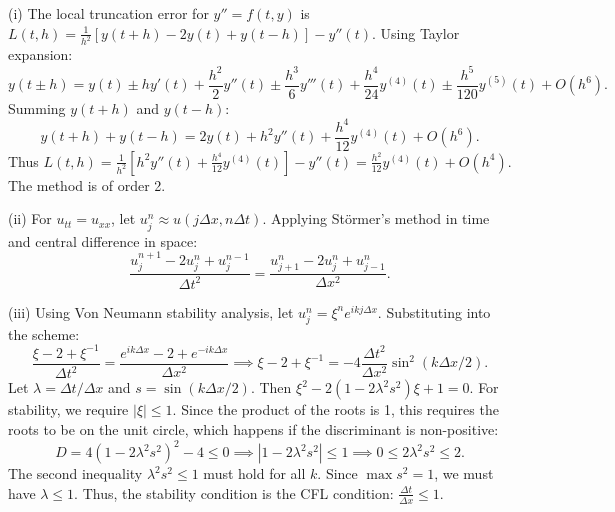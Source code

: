 \begin{solution}
(i) The local truncation error for $y'' = f(t,y)$ is $L(t, h) = \frac{1}{h^2} [y(t+h) - 2y(t) + y(t-h)] - y''(t)$. Using Taylor expansion:
\[
y(t \pm h) = y(t) \pm hy'(t) + \frac{h^2}{2} y''(t) \pm \frac{h^3}{6} y'''(t) + \frac{h^4}{24} y^{(4)}(t) \pm \frac{h^5}{120} y^{(5)}(t) + O(h^6).
\]
Summing $y(t+h)$ and $y(t-h)$:
\[
y(t+h) + y(t-h) = 2y(t) + h^2 y''(t) + \frac{h^4}{12} y^{(4)}(t) + O(h^6).
\]
Thus $L(t, h) = \frac{1}{h^2} [h^2 y''(t) + \frac{h^4}{12} y^{(4)}(t)] - y''(t) = \frac{h^2}{12} y^{(4)}(t) + O(h^4)$.
The method is of order 2.

(ii) For $u_{tt} = u_{xx}$, let $u_j^n \approx u(j \Delta x, n \Delta t)$. Applying St\"ormer's method in time and central difference in space:
\[
\frac{u_j^{n+1} - 2u_j^n + u_j^{n-1}}{\Delta t^2} = \frac{u_{j+1}^n - 2u_j^n + u_{j-1}^n}{\Delta x^2}.
\]

(iii) Using Von Neumann stability analysis, let $u_j^n = \xi^n e^{ik j \Delta x}$. Substituting into the scheme:
\[
\frac{\xi - 2 + \xi^{-1}}{\Delta t^2} = \frac{e^{ik \Delta x} - 2 + e^{-ik \Delta x}}{\Delta x^2} \implies \xi - 2 + \xi^{-1} = -4 \frac{\Delta t^2}{\Delta x^2} \sin^2(k \Delta x / 2).
\]
Let $\lambda = \Delta t / \Delta x$ and $s = \sin(k \Delta x / 2)$. Then $\xi^2 - 2(1 - 2\lambda^2 s^2)\xi + 1 = 0$. For stability, we require $|\xi| \leq 1$. Since the product of the roots is 1, this requires the roots to be on the unit circle, which happens if the discriminant is non-positive:
\[
D = 4(1-2\lambda^2 s^2)^2 - 4 \leq 0 \implies |1-2\lambda^2 s^2| \leq 1 \implies 0 \leq 2\lambda^2 s^2 \leq 2.
\]
The second inequality $\lambda^2 s^2 \leq 1$ must hold for all $k$. Since $\max s^2 = 1$, we must have $\lambda \leq 1$. Thus, the stability condition is the CFL condition: $\frac{\Delta t}{\Delta x} \leq 1$.
\end{solution}
